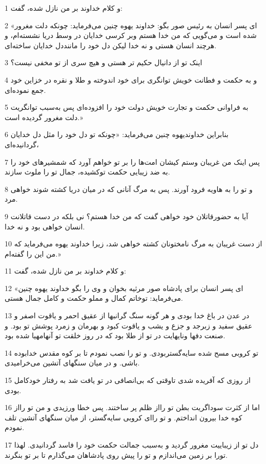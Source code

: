 \par 1 و کلام خداوند بر من نازل شده، گفت:
\par 2 «ای پسر انسان به رئیس صور بگو: خداوند یهوه چنین می‌فرماید: چونکه دلت مغرور شده است و می‌گویی که من خدا هستم وبر کرسی خدایان در وسط دریا نشسته‌ام، و هرچند انسان هستی و نه خدا لیکن دل خود را ماننددل خدایان ساخته‌ای.
\par 3 اینک تو از دانیال حکیم تر هستی و هیچ سری از تو مخفی نیست؟
\par 4 و به حکمت و فطانت خویش توانگری برای خود اندوخته و طلا و نقره در خزاین خود جمع نموده‌ای.
\par 5 به فراوانی حکمت و تجارت خویش دولت خود را افزوده‌ای پس به‌سبب توانگریت دلت مغرور گردیده است.»
\par 6 بنابراین خداوندیهوه چنین می‌فرماید: «چونکه تو دل خود را مثل دل خدایان گردانیده‌ای،
\par 7 پس اینک من غریبان وستم کیشان امت‌ها را بر تو خواهم آورد که شمشیرهای خود را به ضد زیبایی حکمت توکشیده، جمال تو را ملوث سازند.
\par 8 و تو را به هاویه فرود آورند. پس به مرگ آنانی که در میان دریا کشته شوند خواهی مرد.
\par 9 آیا به حضورقاتلان خود خواهی گفت که من خدا هستم؟ نی بلکه در دست قاتلانت انسان خواهی بود و نه خدا.
\par 10 از دست غریبان به مرگ نامختونان کشته خواهی شد، زیرا خداوند یهوه می‌فرماید که من این را گفته‌ام.»
\par 11 و کلام خداوند بر من نازل شده، گفت:
\par 12 «ای پسر انسان برای پادشاه صور مرثیه بخوان و وی را بگو خداوند یهوه چنین می‌فرماید: توخاتم کمال و مملو حکمت و کامل جمال هستی.
\par 13 در عدن در باغ خدا بودی و هر گونه سنگ گرانبها از عقیق احمر و یاقوت اصفر و عقیق سفید و زبرجد و جزع و یشب و یاقوت کبود و بهرمان و زمرد پوشش تو بود. و صنعت دفها ونایهایت در تو از طلا بود که در روز خلقت تو آنهامهیا شده بود.
\par 14 تو کروبی مسح شده سایه‌گستربودی. و تو را نصب نمودم تا بر کوه مقدس خدابوده باشی. و در میان سنگهای آتشین می‌خرامیدی.
\par 15 از روزی که آفریده شدی تاوقتی که بی‌انصافی در تو یافت شد به رفتار خودکامل بودی.
\par 16 اما از کثرت سوداگریت بطن تو رااز ظلم پر ساختند. پس خطا ورزیدی و من تو رااز کوه خدا بیرون انداختم. و تو را‌ای کروبی سایه‌گستر، از میان سنگهای آتشین تلف نمودم.
\par 17 دل تو از زیباییت مغرور گردید و به‌سبب جمالت حکمت خود را فاسد گردانیدی. لهذا تورا بر زمین می‌اندازم و تو را پیش روی پادشاهان می‌گذارم تا بر تو بنگرند.
